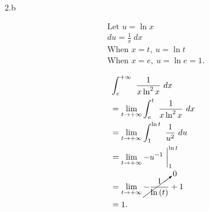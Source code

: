 \documentclass{report}
\begin{document}
    \bigbreak \noindent 
    2.b
    \bigbreak \noindent 
    \begin{minipage}[]{0.47\textwidth}
   \begin{align*}
       &\text{Let $u=\ln{x}$} \\
       &du=\frac{1}{x}\ dx \\
       &\text{When } x=t,\ u=\ln{t} \\
       &\text{When } x=e,\ u=\ln{e} = 1
   .\end{align*} 
    \end{minipage}
    \begin{minipage}[]{0.47\textwidth}
    \begin{align*}
        &\int_{e}^{+\infty}\ \frac{1}{x\ln^{2}{x}}\ dx \\
        &=\lim\limits_{t \to +\infty}{\int_{e}^{t}\ \frac{1}{x\ln^{2}{x}}\ dx} \\
        &=\lim\limits_{t \to +\infty}{\int_{1}^{\ln{t}}\ \frac{1}{u^{2}}\ du} \\
        &=\lim\limits_{t \to +\infty}{-u^{-1}}\ \bigg|_1^{\ln{t}} \\
        &=\lim\limits_{t \to +\infty}{\cancelto{0}{-\frac{1}{\ln{(t)}}}  + 1} \\
        &=1
    .\end{align*}
    \end{minipage}
\end{document}
